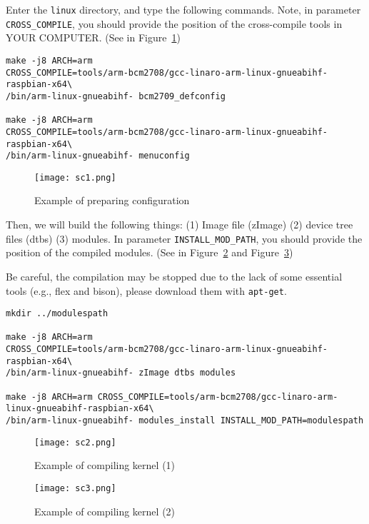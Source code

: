 Enter the \texttt{linux} directory, and type the following commands.
Note, in parameter \texttt{CROSS\_COMPILE}, you 
should provide the position of the cross-compile tools in YOUR 
COMPUTER. (See in Figure~\ref{fig:sc1})




\begin{lstlisting}
make -j8 ARCH=arm 
CROSS_COMPILE=tools/arm-bcm2708/gcc-linaro-arm-linux-gnueabihf-raspbian-x64\
/bin/arm-linux-gnueabihf- bcm2709_defconfig

make -j8 ARCH=arm 
CROSS_COMPILE=tools/arm-bcm2708/gcc-linaro-arm-linux-gnueabihf-raspbian-x64\
/bin/arm-linux-gnueabihf- menuconfig
\end{lstlisting}

\begin{figure}[H]
	\centering
	\texttt{[image: sc1.png]}
	\caption{Example of preparing configuration}
	\label{fig:sc1}
\end{figure}

Then, we will build the following things: (1) Image file (zImage) (2) 
device tree files (dtbs) (3) modules. In parameter 
\texttt{INSTALL\_MOD\_PATH}, you should provide the position of the 
compiled modules. (See in Figure~\ref{fig:sc2} and 
Figure~\ref{fig:sc3})


Be careful, the compilation may be stopped due to the lack of some 
essential tools (e.g., flex and bison), please download them with 
\texttt{apt-get}.

\begin{lstlisting}
mkdir ../modulespath

make -j8 ARCH=arm 
CROSS_COMPILE=tools/arm-bcm2708/gcc-linaro-arm-linux-gnueabihf-raspbian-x64\
/bin/arm-linux-gnueabihf- zImage dtbs modules

make -j8 ARCH=arm CROSS_COMPILE=tools/arm-bcm2708/gcc-linaro-arm-linux-gnueabihf-raspbian-x64\
/bin/arm-linux-gnueabihf- modules_install INSTALL_MOD_PATH=modulespath
\end{lstlisting}

\begin{figure}[H]
	\centering
	\texttt{[image: sc2.png]}
	\caption{Example of compiling kernel (1)}
	\label{fig:sc2}
\end{figure}

\begin{figure}[H]
	\centering
	\texttt{[image: sc3.png]}
	\caption{Example of compiling kernel (2)}
	\label{fig:sc3}
\end{figure}

